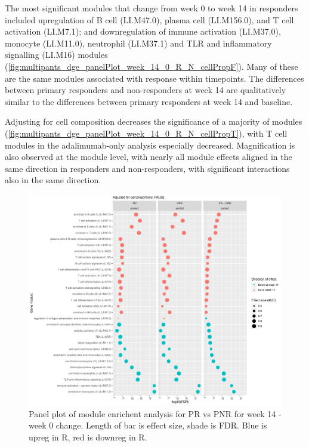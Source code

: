 \begin{outline}
The most significant modules that change from week 0 to week 14 in responders included
upregulation of B cell (LI.M47.0), plasma cell (LI.M156.0), and T cell activation (LI.M7.1);
and downregulation of immune activation (LI.M37.0), monocyte (LI.M11.0), neutrophil (LI.M37.1) and TLR and inflammatory signalling (LI.M16) modules (\autoref{fig:multipants_dge_panelPlot_week_14_0_R_N_cellPropF}).
Many of these are the same modules associated with response within timepoints.
The differences between primary responders and non-responders at week 14 are qualitatively similar to the differences between primary responders at week 14 and baseline.

Adjusting for cell composition decreases the significance of a majority of modules (\autoref{fig:multipants_dge_panelPlot_week_14_0_R_N_cellPropT}),
with T cell modules in the adalimumab-only analysis especially decreased.
Magnification is also observed at the module level, with nearly all module effects aligned in the same direction in responders and non-responders, with significant interactions also in the same direction.

\begin{figure}
    \centering
    \includegraphics[width=1.0\textwidth,page=1]{mainmatter/figures/chapter_04/plot_gene_set_enrichment.tmodCERNO_panelplot_reversed_C_3R_1R,C_3N_1N,C_(3R_1R)_(3N_1N).cell_prop_correction_FALSE.pdf}
    \caption{Panel plot of module enrichent analysis for PR vs PNR for week 14 - week 0 change. Length of bar is effect size, shade is FDR. Blue is upreg in R, red is downreg in R.}
    \label{fig:multipants_dge_panelPlot_week_14_0_R_N_cellPropF}
\end{figure}


\end{outline}

